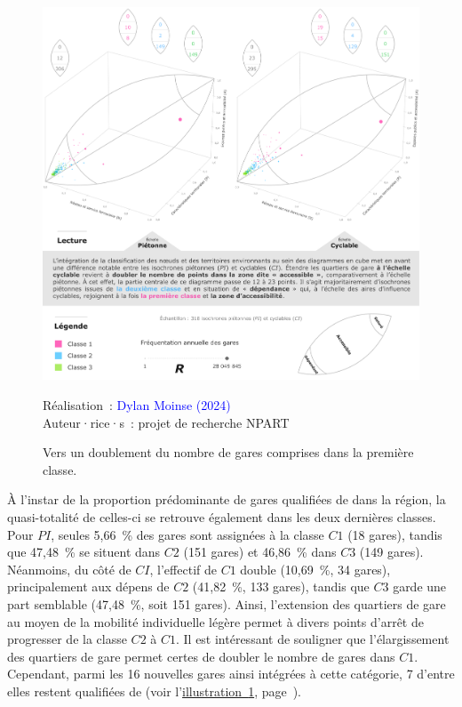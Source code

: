 \begin{refsegment}
    \begin{figure}[h!]\vspace*{4pt}
        \caption{Vers un doublement du nombre de gares comprises dans la première classe.}
        \label{fig-chap6:cubes-classification}
        \centerline{\includegraphics[width=1\columnwidth]{src/Figures/Chap-6/FR_NPART_Cubes_Classification.pdf}}
        \vspace{5pt}
        \begin{flushright}\scriptsize{
        Réalisation~: \textcolor{blue}{Dylan Moinse (2024)}
        \\
        Auteur·rice·s~: projet de recherche \acrshort{NPART}
        }\end{flushright}
    \end{figure}

À l'instar de la proportion prédominante de gares qualifiées de  dans la région, la quasi-totalité de celles-ci se retrouve également dans les deux dernières classes. Pour \(PI\), seules 5,66~\% des gares sont assignées à la classe \(C1\) (18 gares), tandis que 47,48~\% se situent dans \(C2\) (151 gares) et 46,86~\% dans \(C3\) (149 gares). Néanmoins, du côté de \(CI\), l’effectif de \(C1\) double (10,69~\%, 34 gares), principalement aux dépens de \(C2\) (41,82~\%, 133 gares), tandis que \(C3\) garde une part semblable (47,48~\%, soit 151 gares). Ainsi, l’extension des quartiers de gare au moyen de la mobilité individuelle légère permet à divers points d'arrêt de progresser de la classe \(C2\) à \(C1\). Il est intéressant de souligner que l’élargissement des quartiers de gare permet certes de doubler le nombre de gares dans \(C1\). Cependant, parmi les 16 nouvelles gares ainsi intégrées à cette catégorie, 7 d'entre elles restent qualifiées de  (voir l’\hyperref[fig-chap6:cubes-classification]{illustration~\ref{fig-chap6:cubes-classification}}, page~\pageref{fig-chap6:cubes-classification}).%


\end{refsegment}
